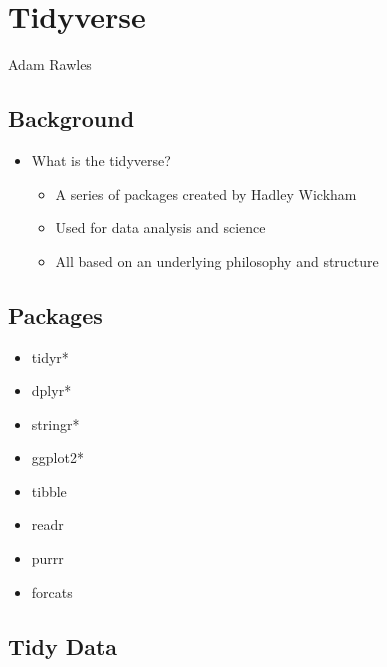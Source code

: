 \documentclass[]{article}
\title{}
\author{}
\date{}
\providecommand{\tightlist}{%
  \setlength{\itemsep}{0pt}\setlength{\parskip}{0pt}}
\begin{document}
\section{Tidyverse}\label{tidyverse}

Adam Rawles

\subsection{Background}\label{background}

\begin{itemize}
\tightlist
\item
  What is the tidyverse?

  \begin{itemize}
  \tightlist
  \item
    A series of packages created by Hadley Wickham
  \item
    Used for data analysis and science
  \item
    All based on an underlying philosophy and structure
  \end{itemize}
\end{itemize}

\subsection{Packages}\label{packages}

\begin{itemize}
\tightlist
\item
  tidyr*
\item
  dplyr*
\item
  stringr*
\item
  ggplot2*
\item
  tibble
\item
  readr
\item
  purrr
\item
  forcats
\end{itemize}

\subsection{Tidy Data}\label{tidy-data}
\end{document}
